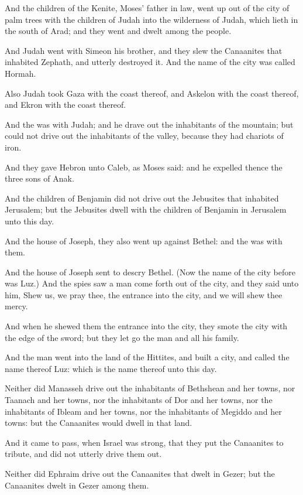 \verse And the children of the Kenite, Moses' father in law, went up out of the city of palm trees with the children of Judah into the wilderness of Judah, which lieth in the south of Arad; and they went and dwelt among the people.

\verse And Judah went with Simeon his brother, and they slew the Canaanites that inhabited Zephath, and utterly destroyed it. And the name of the city was called Hormah.

\verse Also Judah took Gaza with the coast thereof, and Askelon with the coast thereof, and Ekron with the coast thereof.

\verse And the \LORD was with Judah; and he drave out the inhabitants of the mountain; but could not drive out the inhabitants of the valley, because they had chariots of iron.

\verse And they gave Hebron unto Caleb, as Moses said: and he expelled thence the three sons of Anak.

\verse And the children of Benjamin did not drive out the Jebusites that inhabited Jerusalem; but the Jebusites dwell with the children of Benjamin in Jerusalem unto this day.

\verse And the house of Joseph, they also went up against Bethel: and the \LORD was with them.

\verse And the house of Joseph sent to descry Bethel. (Now the name of the city before was Luz.)  \verse And the spies saw a man come forth out of the city, and they said unto him, Shew us, we pray thee, the entrance into the city, and we will shew thee mercy.

\verse And when he shewed them the entrance into the city, they smote the city with the edge of the sword; but they let go the man and all his family.

\verse And the man went into the land of the Hittites, and built a city, and called the name thereof Luz: which is the name thereof unto this day.

\verse Neither did Manasseh drive out the inhabitants of Bethshean and her towns, nor Taanach and her towns, nor the inhabitants of Dor and her towns, nor the inhabitants of Ibleam and her towns, nor the inhabitants of Megiddo and her towns: but the Canaanites would dwell in that land.

\verse And it came to pass, when Israel was strong, that they put the Canaanites to tribute, and did not utterly drive them out.

\verse Neither did Ephraim drive out the Canaanites that dwelt in Gezer; but the Canaanites dwelt in Gezer among them.

